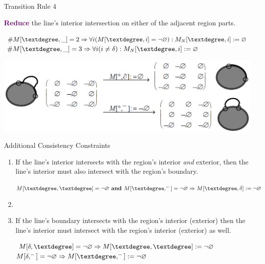 	\begin{frame}{Transition Rule 4}
		\begin{block}{}
			\textcolor{purple}{\textbf{Reduce}} the line's interior intersection on either of the adjacent region parts.
		\end{block}
		\begin{block}{}
			\centering
			$ \#M[\textdegree, \_] = 2 \Rightarrow
			\forall i (M[\textdegree, i] = \NotEmpty):
			M_{N}[\textdegree, i] := \Empty $
			$ \#M[\textdegree, \_] = 3 \Rightarrow
			\forall i (i \neq \delta):
			M_{N}[\textdegree, i] := \Empty $
		\end{block}
		\begin{block}{}
			\includegraphics[width=\textwidth]{images/smooth_transitions_example_d.png}
		\end{block}
	\end{frame}
	
	\begin{frame}{Additional Consistency Constraints}
		\begin{enumerate}
			\item If the line's interior intersects with the region's interior \textit{and} exterior, then the line's interior must also intersect with the region's boundary.
			\\ \vspace{6pt}
			\begin{center}
				$ M[\textdegree,\textdegree] = \NotEmpty \text{\textbf{ and }} M[\textdegree,^{-}] = \NotEmpty \Rightarrow M[\textdegree,\delta] := \NotEmpty $
			\end{center}
			\item[ ]
			\item If the line's boundary intersects with the region's interior (exterior) then the line's interior must intersect with the region's interior (exterior) as well.
			\\ \vspace{6pt}
			\begin{center}
				$ M[\delta,\textdegree] = \NotEmpty \Rightarrow M[\textdegree,\textdegree] := \NotEmpty $ \\
				$ M[\delta, ^{-}] = \NotEmpty \Rightarrow M[\textdegree,^{-}] := \NotEmpty $
			\end{center}
		\end{enumerate}
		
	\end{frame}
	
